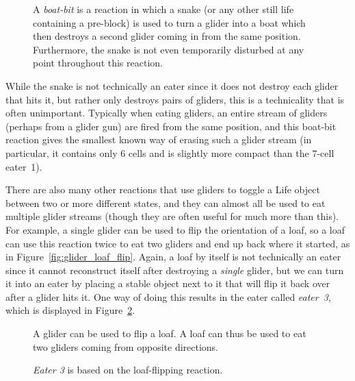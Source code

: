 \begin{figure}[!htb]
	\centering
	\caption{A \emph{boat-bit} is a reaction in which a snake (or any other still life containing a pre-block) is used to turn a glider into a boat which then destroys a second glider coming in from the same position. Furthermore, the snake is not even temporarily disturbed at any point throughout this reaction.}\label{fig:boat_bit}
\end{figure}

While the snake is not technically an eater since it does not destroy each glider that hits it, but rather only destroys pairs of gliders, this is a technicality that is often unimportant. Typically when eating gliders, an entire stream of gliders (perhaps from a glider gun) are fired from the same position, and this boat-bit reaction gives the smallest known way of erasing such a glider stream (in particular, it contains only $6$ cells and is slightly more compact than the $7$-cell eater~1).

There are also many other reactions that use gliders to toggle a Life object between two or more different states, and they can almost all be used to eat multiple glider streams (though they are often useful for much more than this). For example, a single glider can be used to flip the orientation of a loaf, so a loaf can use this reaction twice to eat two gliders and end up back where it started, as in Figure~\ref{fig:glider_loaf_flip}. Again, a loaf by itself is not technically an eater since it cannot reconstruct itself after destroying a \emph{single} glider, but we can turn it into an eater by placing a stable object next to it that will flip it back over after a glider hits it. One way of doing this results in the eater called \emph{eater~3}, which is displayed in Figure~\ref{fig:eater_3}.

\begin{figure}[!htb]
	\centering
	\begin{minipage}{.61\textwidth}
		\centering
		\caption{A glider can be used to flip a loaf. A loaf can thus be used to eat two gliders coming from opposite directions.}\label{fig:glider_loaf_flip}
	\end{minipage} \quad %
	\begin{minipage}{.33\textwidth}
		\centering
		\caption{\emph{Eater 3} is based on the loaf-flipping reaction.}
		\label{fig:eater_3}
	\end{minipage}
\end{figure}

